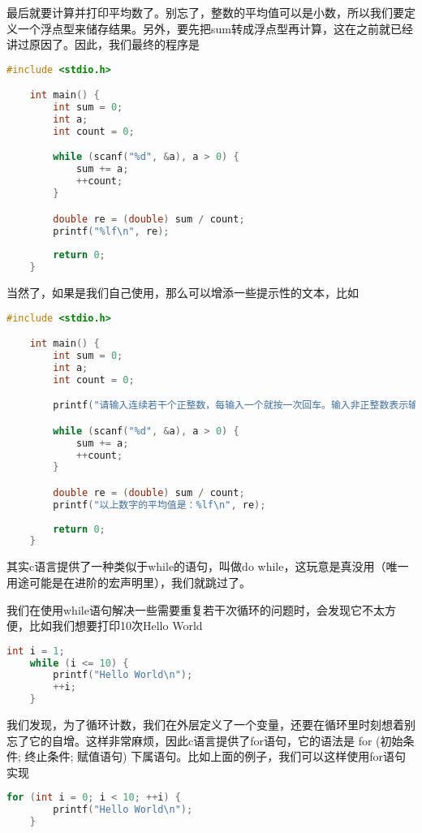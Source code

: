 最后就要计算并打印平均数了。别忘了，整数的平均值可以是小数，所以我们要定义一个浮点型来储存结果。另外，要先把sum转成浮点型再计算，这在之前就已经讲过原因了。因此，我们最终的程序是

\begin{lstlisting}[language=C]
    #include <stdio.h>

    int main() {
        int sum = 0;
        int a;
        int count = 0;

        while (scanf("%d", &a), a > 0) {
            sum += a;
            ++count;
        }

        double re = (double) sum / count;
        printf("%lf\n", re);
        
        return 0;
    }
\end{lstlisting}

当然了，如果是我们自己使用，那么可以增添一些提示性的文本，比如

\begin{lstlisting}[language=C]
    #include <stdio.h>

    int main() {
        int sum = 0;
        int a;
        int count = 0;

        printf("请输入连续若干个正整数，每输入一个就按一次回车。输入非正整数表示输入完成\n");

        while (scanf("%d", &a), a > 0) {
            sum += a;
            ++count;
        }

        double re = (double) sum / count;
        printf("以上数字的平均值是：%lf\n", re);
        
        return 0;
    }
\end{lstlisting}

其实c语言提供了一种类似于while的语句，叫做do while，这玩意是真没用（唯一用途可能是在进阶的宏声明里），我们就跳过了。

我们在使用while语句解决一些需要重复若干次循环的问题时，会发现它不太方便，比如我们想要打印10次Hello World

\begin{lstlisting}[language=C]
    int i = 1;
    while (i <= 10) {
        printf("Hello World\n");
        ++i;
    }
\end{lstlisting}

我们发现，为了循环计数，我们在外层定义了一个变量，还要在循环里时刻想着别忘了它的自增。这样非常麻烦，因此c语言提供了for语句，它的语法是 for (初始条件; 终止条件; 赋值语句) 下属语句。比如上面的例子，我们可以这样使用for语句实现

\begin{lstlisting}[language=C]
    for (int i = 0; i < 10; ++i) {
        printf("Hello World\n");
    }
\end{lstlisting}

